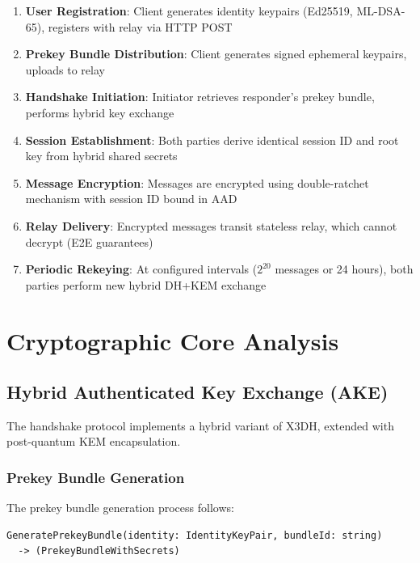 \documentclass[11pt,a4paper,oneside]{article}
\begin{document}
\begin{enumerate}
\item \textbf{User Registration}: Client generates identity keypairs (Ed25519, ML-DSA-65), registers with relay via HTTP POST
\item \textbf{Prekey Bundle Distribution}: Client generates signed ephemeral keypairs, uploads to relay
\item \textbf{Handshake Initiation}: Initiator retrieves responder's prekey bundle, performs hybrid key exchange
\item \textbf{Session Establishment}: Both parties derive identical session ID and root key from hybrid shared secrets
\item \textbf{Message Encryption}: Messages are encrypted using double-ratchet mechanism with session ID bound in AAD
\item \textbf{Relay Delivery}: Encrypted messages transit stateless relay, which cannot decrypt (E2E guarantees)
\item \textbf{Periodic Rekeying}: At configured intervals ($2^{20}$ messages or 24 hours), both parties perform new hybrid DH+KEM exchange
\end{enumerate}

\section{Cryptographic Core Analysis}

\subsection{Hybrid Authenticated Key Exchange (AKE)}

The handshake protocol implements a hybrid variant of X3DH, extended with post-quantum KEM encapsulation.

\subsubsection{Prekey Bundle Generation}

The prekey bundle generation process follows:

\begin{lstlisting}[language={}]
GeneratePrekeyBundle(identity: IdentityKeyPair, bundleId: string)
  -> (PrekeyBundleWithSecrets)
\end{lstlisting}
\end{document}
